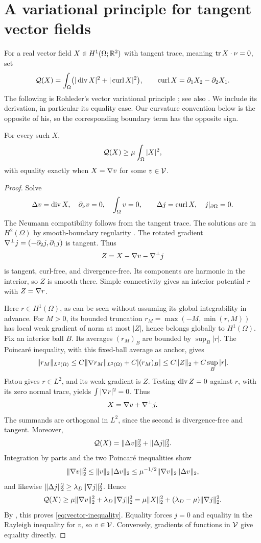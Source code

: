 \section{A variational principle for tangent vector fields}\label{sec:vector}

For a real vector field $X\in H^1(\Omega;\mathbb R^2)$ with tangent trace, meaning $\operatorname{tr} X\cdot\nu=0$, set
\[
\mathcal Q(X)=\int_\Omega\bigl(|\operatorname{div} X|^2+|\operatorname{curl} X|^2\bigr),
\qquad \operatorname{curl} X=\partial_1X_2-\partial_2X_1.
\]
The following is Rohleder's vector variational principle \cite[Theorem~1.1]{Rohleder2021}; see also \cite{Rohleder2024}. We include its derivation, in particular its equality case. Our curvature convention below is the opposite of his, so the corresponding boundary term has the opposite sign.

\begin{proposition}\label{prop:vector}
For every such $X$,
\begin{equation}\label{eq:vector-inequality}
\mathcal Q(X)\ge\mu\int_\Omega|X|^2,
\end{equation}
with equality exactly when $X=\nabla v$ for some $v\in\mathcal V$.
\end{proposition}
\begin{proof}
Solve
\[
\Delta v=\operatorname{div} X,\quad \partial_\nu v=0,\quad\int_\Omega v=0,
\qquad
\Delta j=\operatorname{curl} X,\quad j|_{\partial\Omega}=0.
\]
The Neumann compatibility follows from the tangent trace. The solutions are in $H^2(\Omega)$ by smooth-boundary regularity \cite[Chapter~III, Theorems~6.1 and~6.4]{Showalter1994}. The rotated gradient $\nabla^\perp j=(-\partial_2j,\partial_1j)$ is tangent. Thus
\[
Z=X-\nabla v-\nabla^\perp j
\]
is tangent, curl-free, and divergence-free. Its components are harmonic in the interior, so $Z$ is smooth there. Simple connectivity gives an interior potential $r$ with $Z=\nabla r$.

Here $r\in H^1(\Omega)$, as can be seen without assuming its global integrability in advance. For $M>0$, its bounded truncation $r_M=\max(-M,\min(r,M))$ has local weak gradient of norm at most $|Z|$, hence belongs globally to $H^1(\Omega)$. Fix an interior ball $B$. Its averages $(r_M)_B$ are bounded by $\sup_B|r|$. The Poincar\'e inequality, with this fixed-ball average as anchor, gives
\[
\lVert r_M\rVert_{L^2(\Omega)}
\le C\lVert \nabla r_M\rVert_{L^2(\Omega)}+C|(r_M)_B|
\le C\lVert Z\rVert_2+C\sup_B|r|.
\]
Fatou gives $r\in L^2$, and its weak gradient is $Z$. Testing $\operatorname{div} Z=0$ against $r$, with its zero normal trace, yields $\int|\nabla r|^2=0$. Thus
\[
X=\nabla v+\nabla^\perp j.
\]
The summands are orthogonal in $L^2$, since the second is divergence-free and tangent. Moreover,
\[
\mathcal Q(X)=\lVert \Delta v\rVert_2^2+\lVert \Delta j\rVert_2^2.
\]
Integration by parts and the two Poincar\'e inequalities show
\[
\lVert \nabla v\rVert_2^2
\le\lVert v\rVert_2\lVert \Delta v\rVert_2
\le\mu^{-1/2}\lVert \nabla v\rVert_2\lVert \Delta v\rVert_2,
\]
and likewise $\lVert \Delta j\rVert_2^2\ge\lambda_D\lVert \nabla j\rVert_2^2$. Hence
\[
\mathcal Q(X)\ge\mu\lVert \nabla v\rVert_2^2+\lambda_D\lVert \nabla j\rVert_2^2
=\mu\lVert X\rVert_2^2+(\lambda_D-\mu)\lVert \nabla j\rVert_2^2.
\]
By , this proves \eqref{eq:vector-inequality}. Equality forces $j=0$ and equality in the Rayleigh inequality for $v$, so $v\in\mathcal V$. Conversely, gradients of functions in $\mathcal V$ give equality directly.
\end{proof}

